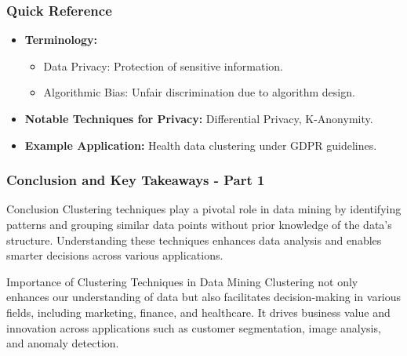 \documentclass[aspectratio=169]{beamer}
\begin{document}
\begin{frame}[fragile]
    \frametitle{Quick Reference}
    \begin{itemize}
        \item \textbf{Terminology:}
        \begin{itemize}
            \item Data Privacy: Protection of sensitive information.
            \item Algorithmic Bias: Unfair discrimination due to algorithm design.
        \end{itemize}
        \item \textbf{Notable Techniques for Privacy:}
        Differential Privacy, K-Anonymity.
        \item \textbf{Example Application:}
        Health data clustering under GDPR guidelines.
    \end{itemize}
\end{frame}

\begin{frame}[fragile]
    \frametitle{Conclusion and Key Takeaways - Part 1}
    \begin{block}{Conclusion}
        Clustering techniques play a pivotal role in data mining by identifying patterns and grouping similar data points without prior knowledge of the data's structure. Understanding these techniques enhances data analysis and enables smarter decisions across various applications.
    \end{block}
    \begin{block}{Importance of Clustering Techniques in Data Mining}
        Clustering not only enhances our understanding of data but also facilitates decision-making in various fields, including marketing, finance, and healthcare. It drives business value and innovation across applications such as customer segmentation, image analysis, and anomaly detection.
    \end{block}
\end{frame}
\end{document}
